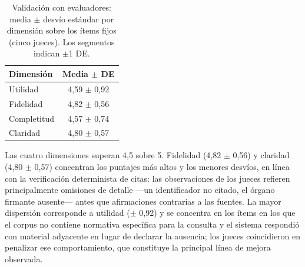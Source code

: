 \documentclass{llncs}
\begin{document}
\nopagebreak\begin{table}[H]
\centering\small
\caption{Validación con evaluadores: media $\pm$ desvío estándar por
dimensión sobre los ítems fijos (cinco jueces). Los segmentos indican
$\pm$1 DE.}
\label{tab:jueces}
\begin{minipage}[c]{0.40\textwidth}
\centering
\begin{tabular}{lc}
\toprule
Dimensión & Media $\pm$ DE \\
\midrule
Utilidad     & 4,59 $\pm$ 0,92 \\
Fidelidad    & 4,82 $\pm$ 0,56 \\
Completitud  & 4,57 $\pm$ 0,74 \\
Claridad     & 4,80 $\pm$ 0,57 \\
\bottomrule
\end{tabular}
\end{minipage}\hfill
\begin{minipage}[c]{0.56\textwidth}
\centering
{}
\end{minipage}
\end{table}

Las cuatro dimensiones superan 4,5 sobre 5. Fidelidad (4,82 $\pm$ 0,56) y
claridad (4,80 $\pm$ 0,57) concentran los puntajes más altos y los menores
desvíos, en línea con la verificación determinista de citas: las
observaciones de los jueces refieren principalmente omisiones de detalle ---un
identificador no citado, el órgano firmante ausente--- antes que afirmaciones
contrarias a las fuentes. La mayor dispersión corresponde a utilidad ($\pm$
0,92) y se concentra en los ítems en los que el corpus no contiene normativa
específica para la consulta y el sistema respondió con material adyacente en
lugar de declarar la ausencia; los jueces coincidieron en penalizar ese
comportamiento, que constituye la principal línea de mejora observada.
\end{document}
